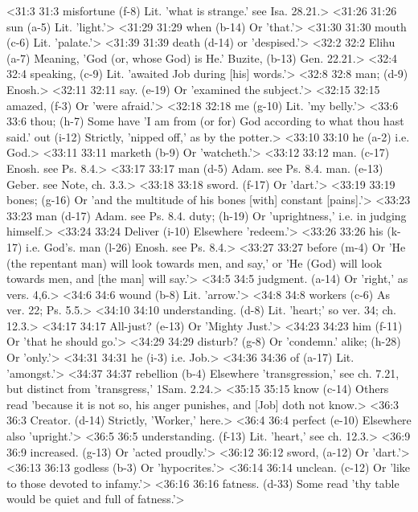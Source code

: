<31:3 31:3  misfortune (f-8)  Lit. 'what is strange.' see Isa. 28.21.>
<31:26 31:26  sun (a-5)  Lit. 'light.'>
<31:29 31:29  when (b-14)  Or 'that.'>
<31:30 31:30  mouth (c-6)  Lit. 'palate.'>
<31:39 31:39  death (d-14)  or 'despised.'>
<32:2 32:2  Elihu (a-7)  Meaning, 'God (or, whose God) is He.'
  Buzite, (b-13)  Gen. 22.21.>
<32:4 32:4  speaking, (c-9)  Lit. 'awaited Job during [his] words.'>
<32:8 32:8  man; (d-9)  Enosh.>
<32:11 32:11  say. (e-19)  Or 'examined the subject.'>
<32:15 32:15  amazed, (f-3)  Or 'were afraid.'>
<32:18 32:18  me (g-10)  Lit. 'my belly.'>
<33:6 33:6  thou; (h-7)  Some have 'I am from (or for) God according to what thou hast  said.'
  out (i-12)  Strictly, 'nipped off,' as by the potter.>
<33:10 33:10  he (a-2)  i.e. God.>
<33:11 33:11  marketh (b-9)  Or 'watcheth.'>
<33:12 33:12  man. (c-17)  Enosh. see Ps. 8.4.>
<33:17 33:17  man (d-5) Adam. see Ps. 8.4.
  man. (e-13)  Geber. see Note, ch. 3.3.>
<33:18 33:18  sword. (f-17)  Or 'dart.'>
<33:19 33:19  bones; (g-16)  Or 'and the multitude of his bones [with] constant [pains].'>
<33:23 33:23  man (d-17)  Adam. see Ps. 8.4.
  duty; (h-19)  Or 'uprightness,' i.e. in judging himself.>
<33:24 33:24  Deliver (i-10)  Elsewhere 'redeem.'>
<33:26 33:26  his (k-17)  i.e. God's.
  man (l-26)  Enosh. see Ps. 8.4.>
<33:27 33:27  before (m-4)  Or 'He (the repentant man) will look towards men, and say,'  or 'He (God) will look towards men, and [the man] will say.'>
<34:5 34:5  judgment. (a-14)  Or 'right,' as vers. 4,6.>
<34:6 34:6  wound (b-8)  Lit. 'arrow.'>
<34:8 34:8  workers (c-6)  As ver. 22; Ps. 5.5.>
<34:10 34:10  understanding. (d-8)  Lit. 'heart;' so ver. 34; ch. 12.3.>
<34:17 34:17  All-just? (e-13)  Or 'Mighty Just.'>
<34:23 34:23  him (f-11)  Or 'that he should go.'>
<34:29 34:29  disturb? (g-8)  Or 'condemn.'
  alike; (h-28)  Or 'only.'>
<34:31 34:31  he (i-3)  i.e. Job.>
<34:36 34:36  of (a-17)  Lit. 'amongst.'>
<34:37 34:37  rebellion (b-4)  Elsewhere 'transgression,' see ch. 7.21, but distinct from  'transgress,' 1Sam. 2.24.>
<35:15 35:15  know (c-14)  Others read 'because it is not so, his anger punishes, and  [Job] doth not know.>
<36:3 36:3  Creator. (d-14)  Strictly, 'Worker,' here.>
<36:4 36:4  perfect (e-10)  Elsewhere also 'upright.'>
<36:5 36:5  understanding. (f-13)  Lit. 'heart,' see ch. 12.3.>
<36:9 36:9  increased. (g-13)  Or 'acted proudly.'>
<36:12 36:12  sword, (a-12)  Or 'dart.'>
<36:13 36:13  godless (b-3)  Or 'hypocrites.'>
<36:14 36:14  unclean. (c-12)  Or 'like to those devoted to infamy.'>
<36:16 36:16  fatness. (d-33)  Some read 'thy table would be quiet and full of fatness.'>
